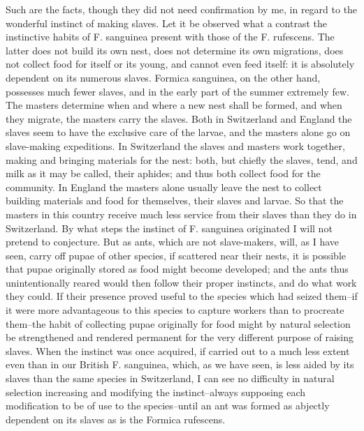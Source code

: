 Such are the facts, though they did not need confirmation by me, in regard to the wonderful instinct of making slaves. Let it be observed what a contrast the instinctive habits of F. sanguinea present with those of the F. rufescens. The latter does not build its own nest, does not determine its own migrations, does not collect food for itself or its young, and cannot even feed itself: it is absolutely dependent on its numerous slaves. Formica sanguinea, on the other hand, possesses much fewer slaves, and in the early part of the summer extremely few. The masters determine when and where a new nest shall be formed, and when they migrate, the masters carry the slaves. Both in Switzerland and England the slaves seem to have the exclusive care of the larvae, and the masters alone go on slave-making expeditions. In Switzerland the slaves and masters work together, making and bringing materials for the nest: both, but chiefly the slaves, tend, and milk as it may be called, their aphides; and thus both collect food for the community. In England the masters alone usually leave the nest to collect building materials and food for themselves, their slaves and larvae. So that the masters in this country receive much less service from their slaves than they do in Switzerland.
By what steps the instinct of F. sanguinea originated I will not pretend to conjecture. But as ants, which are not slave-makers, will, as I have seen, carry off pupae of other species, if scattered near their nests, it is possible that pupae originally stored as food might become developed; and the ants thus unintentionally reared would then follow their proper instincts, and do what work they could. If their presence proved useful to the species which had seized them--if it were more advantageous to this species to capture workers than to procreate them--the habit of collecting pupae originally for food might by natural selection be strengthened and rendered permanent for the very different purpose of raising slaves. When the instinct was once acquired, if carried out to a much less extent even than in our British F. sanguinea, which, as we have seen, is less aided by its slaves than the same species in Switzerland, I can see no difficulty in natural selection increasing and modifying the instinct--always supposing each modification to be of use to the species--until an ant was formed as abjectly dependent on its slaves as is the Formica rufescens.

